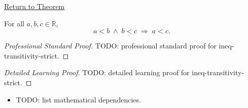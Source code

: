 \newpage
{}
\label{prf:ineq-transitivity-strict}

\begin{remark*}[Return]
\hyperref[thm:ineq-transitivity-strict]{Return to Theorem}
\end{remark*}

\begin{theorem*}
For all $a, b, c \in \mathbb{R}$,
\[
  a < b \;\land\; b < c \;\Rightarrow\; a < c.
\]
\end{theorem*}

\begin{proof}[Professional Standard Proof]
\LRAProofBodyStart
TODO: professional standard proof for ineq-transitivity-strict.
\end{proof}

\begin{proof}[Detailed Learning Proof]
\LRAProofBodyStart
TODO: detailed learning proof for ineq-transitivity-strict.
\end{proof}

\begin{remark*}
\end{remark*}

\begin{dependencies}
\begin{itemize}
  \item TODO: list mathematical dependencies.
\end{itemize}
\end{dependencies}

\clearpage
